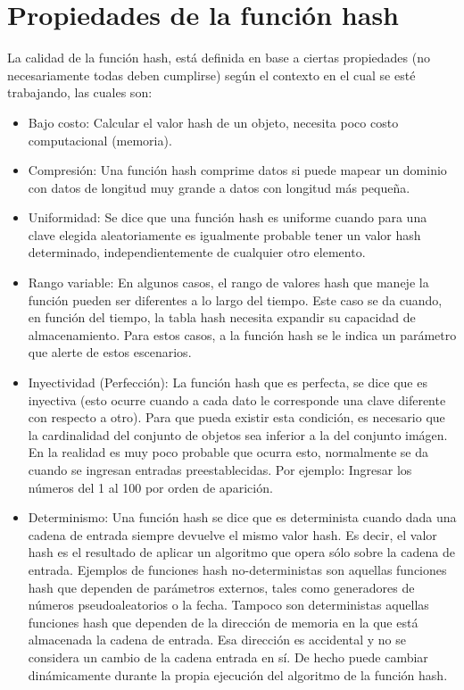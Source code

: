 \documentclass[letterpaper,openright,12pt]{report}
\begin{document}
\newpage


\section{Propiedades de la función hash}

La calidad de la función hash, está definida en base a ciertas propiedades (no necesariamente todas deben cumplirse) según el contexto en el cual se esté trabajando, las cuales son:
\begin{itemize}
\itemsep1pt\parskip0pt
\item
  Bajo costo: Calcular el valor hash de un objeto, necesita poco costo computacional (memoria).
\item
  Compresión: Una función hash comprime datos si puede mapear un dominio con datos de longitud muy grande a datos con longitud más pequeña.
\item
  Uniformidad: Se dice que una función hash es uniforme cuando para una clave elegida aleatoriamente es igualmente probable tener un valor hash determinado, independientemente de cualquier otro elemento.
\newpage
\item
  Rango variable: En algunos casos, el rango de valores hash que maneje la función pueden ser diferentes a lo largo del tiempo. Este caso se da cuando, en función del tiempo, la tabla hash necesita expandir su capacidad de almacenamiento. Para estos casos, a la función hash se le indica un parámetro que alerte de estos escenarios.
\item
  Inyectividad (Perfección): La función hash que es perfecta, se dice que es inyectiva (esto ocurre cuando a cada dato le corresponde una clave diferente con respecto a otro). Para que pueda existir esta condición, es necesario que la cardinalidad del conjunto de objetos sea inferior a la del conjunto imágen. En la realidad es muy poco probable que ocurra esto, normalmente se da cuando se ingresan entradas preestablecidas. Por ejemplo: Ingresar los números del 1 al 100 por orden de aparición.
\item
  Determinismo: Una función hash se dice que es determinista cuando dada una cadena de entrada siempre devuelve el mismo valor hash. Es decir, el valor hash es el resultado de aplicar un algoritmo que opera sólo sobre la cadena de entrada. Ejemplos de funciones hash no-deterministas son aquellas funciones hash que dependen de parámetros externos, tales como generadores de números pseudoaleatorios o la fecha. Tampoco son deterministas aquellas funciones hash que dependen de la dirección de memoria en la que está almacenada la cadena de entrada. Esa dirección es accidental y no se considera un cambio de la cadena entrada en sí. De hecho puede cambiar dinámicamente durante la propia ejecución del algoritmo de la función hash.
\end{itemize}
\newpage
\end{document}
